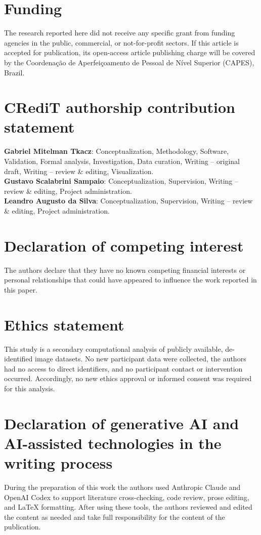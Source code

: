 \documentclass[preprint,review,12pt]{elsarticle}
\begin{document}
\section*{Funding}
The research reported here did not receive any specific grant from funding agencies in the public, commercial, or not-for-profit sectors. If this article is accepted for publication, its open-access article publishing charge will be covered by the Coordena\c{c}\~ao de Aperfei\c{c}oamento de Pessoal de N\'ivel Superior (CAPES), Brazil.


\section*{CRediT authorship contribution statement}
\textbf{Gabriel Mitelman Tkacz}: Conceptualization, Methodology, Software, Validation, Formal analysis, Investigation, Data curation, Writing -- original draft, Writing -- review \& editing, Visualization. \\
\textbf{Gustavo Scalabrini Sampaio}: Conceptualization, Supervision, Writing -- review \& editing, Project administration. \\
\textbf{Leandro Augusto da Silva}: Conceptualization, Supervision, Writing -- review \& editing, Project administration.


\section*{Declaration of competing interest}
The authors declare that they have no known competing financial interests or personal relationships that could have appeared to influence the work reported in this paper.


\section*{Ethics statement}
This study is a secondary computational analysis of publicly available, de-identified image datasets. No new participant data were collected, the authors had no access to direct identifiers, and no participant contact or intervention occurred. Accordingly, no new ethics approval or informed consent was required for this analysis.


\section*{Declaration of generative AI and AI-assisted technologies in the writing process}
During the preparation of this work the authors used Anthropic Claude and OpenAI Codex to support literature cross-checking, code review, prose editing, and LaTeX formatting. After using these tools, the authors reviewed and edited the content as needed and take full responsibility for the content of the publication.
\end{document}

